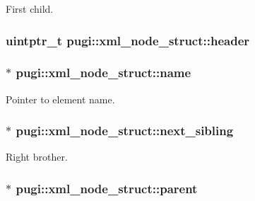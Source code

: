 First child. 

\hypertarget{structpugi_1_1xml__node__struct_aea2e405a368dc5a278a2d23465f1975c}{
\subsubsection[{header}]{\setlength{\rightskip}{0pt plus 5cm}uintptr\-\_\-t pugi\-::xml\-\_\-node\-\_\-struct\-::header}}\label{structpugi_1_1xml__node__struct_aea2e405a368dc5a278a2d23465f1975c}
\hypertarget{structpugi_1_1xml__node__struct_ae2324fdbd1e307fb12007d1d0f957a0b}{
\subsubsection[{name}]{$\ast$ pugi\-::xml\-\_\-node\-\_\-struct\-::name}}\label{structpugi_1_1xml__node__struct_ae2324fdbd1e307fb12007d1d0f957a0b}


Pointer to element name. 

\hypertarget{structpugi_1_1xml__node__struct_acf0867e3a77871e37132046d97398a6d}{
\subsubsection[{next\-\_\-sibling}]{$\ast$ pugi\-::xml\-\_\-node\-\_\-struct\-::next\-\_\-sibling}}\label{structpugi_1_1xml__node__struct_acf0867e3a77871e37132046d97398a6d}


Right brother. 

\hypertarget{structpugi_1_1xml__node__struct_af692c222bcc5a9f61108cb3ae0b7b5ea}{
\subsubsection[{parent}]{$\ast$ pugi\-::xml\-\_\-node\-\_\-struct\-::parent}}\label{structpugi_1_1xml__node__struct_af692c222bcc5a9f61108cb3ae0b7b5ea}


